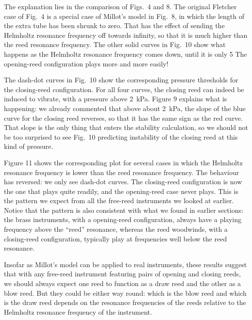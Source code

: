   The explanation lies in the comparison of Figs.\ 4 and 8. The original 
  Fletcher case of Fig.\ 4 is a special case of Millot’s model in Fig.\ 8, in 
  which the length of the extra tube has been shrunk to zero. That has the 
  effect of sending the Helmholtz resonance frequency off towards infinity, so 
  that it is much higher than the reed resonance frequency. The other solid 
  curves in Fig.\ 10 show what happens as the Helmholtz resonance frequency 
  comes down, until it is only 5%
  The opening-reed configuration plays more and more easily! 

  The dash-dot curves in Fig.\ 10 show the corresponding pressure thresholds 
  for the closing-reed configuration. For all four curves, the closing reed can 
  indeed be induced to vibrate, with a pressure above 2~kPa. Figure 9 explains 
  what is happening: we already commented that above about 2~kPa, the slope of 
  the blue curve for the closing reed reverses, so that it has the same sign as 
  the red curve. That slope is the only thing that enters the stability 
  calculation, so we should not be too surprised to see Fig.\ 10 predicting 
  instability of the closing reed at this kind of pressure. 

  Figure 11 shows the corresponding plot for several cases in which the 
  Helmholtz resonance frequency is lower than the reed resonance frequency. The 
  behaviour has reversed: we only see dash-dot curves. The closing-reed 
  configuration is now the one that plays quite readily, and the opening-reed 
  case never plays. This is the pattern we expect from all the free-reed 
  instruments we looked at earlier. Notice that the pattern is also consistent 
  with what we found in earlier sections: the brass instruments, with a 
  opening-reed configuration, always have a playing frequency above the “reed” 
  resonance, whereas the reed woodwinds, with a closing-reed configuration, 
  typically play at frequencies well below the reed resonance. 

  Insofar as Millot’s model can be applied to real instruments, these results 
  suggest that with any free-reed instrument featuring pairs of opening and 
  closing reeds, we should always expect one reed to function as a draw reed 
  and the other as a blow reed. But they could be either way round: which is 
  the blow reed and which is the draw reed depends on the resonance frequencies 
  of the reeds relative to the Helmholtz resonance frequency of the instrument. 

